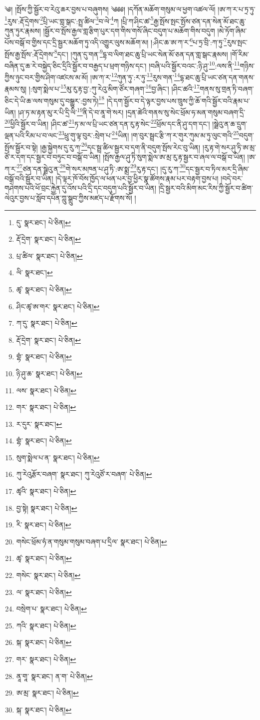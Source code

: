 \setcounter{footnote}{0} 
༄། །སྤོས་ཀྱི་སྦྱོར་བ་རེའུ་ཆར་བྱས་པ་བཞུགས། ༄༅༅། །དཀོན་མཆོག་གསུམ་ལ་ཕྱག་འཚལ་ལོ། །ཨ་ཀ་ར་པ་ཏྲ་ཏུ་\footnote{དུ་  སྣར་ཐང་།  པེ་ཅིན། }རུས་:རྡོ་དྲེགས་\footnote{རྡོ་དྲེག་  སྣར་ཐང་།  པེ་ཅིན། }པྲི་ཡང་གླ་སྒང་:སྤྲ་ཚིལ་\footnote{པྲ་ཚིལ་  སྣར་ཐང་།  པེ་ཅིན། }བ་ལེ་\footnote{ལི་  སྣར་ཐང་། }ཀ །པྲི་ཀ་ཤིང་ཚ་\footnote{ཚྭ་  སྣར་ཐང་།  པེ་ཅིན། }རྒྱ་སྤོས་སྤང་སྤོས་ཙན་དན་སེན་མོ་ཐང་ཆུ་ཀུན་ཏུར་རྣམས། །སྦྱོར་བ་སྤོས་རྒྱལ་གླ་རྩིག་པུར་དག་གིས་གསོ་ཞིང་བདུག་པ་མཆོག་གིས་བདུག །མེ་ཏོག་ཞིམ་པོས་བསྒོ་བ་གྱིས་དང་དྲི་སྦྱར་མཆོག་ཏུ་འདི་འགྱུར་ལུས་མཆོག་མ། །:ཤིང་ཆ་ཨ་ཀ་ར་\footnote{ཤིང་ཚྭ་ཨ་གར་  སྣར་ཐང་།  པེ་ཅིན། }པ་ཏྲ་བྲི་:ཀ་ཏུ་\footnote{ཀ་དུ་  སྣར་ཐང་།  པེ་ཅིན། }རུས་སྤང་སྤོས་རྒྱ་སྤོས་:རྡོ་དྲེགས་\footnote{རྡོ་དྲེག་  སྣར་ཐང་།  པེ་ཅིན། }དང་། །ཀུན་དུ་གན་\footnote{གྷཾ་  སྣར་ཐང་།  པེ་ཅིན། }དྷ་བ་ལིག་ཐང་ཆུ་པྲི་ཡང་སེན་མོ་ཅན་དན་གླ་སྒང་རྣམས། །གོ་རིམ་བཞིན་དུ་ཆ་རེ་བསྐྱེད་ཅིང་དྲིའི་སྦྱོར་བ་བརྒྱད་པ་ཕྲག་གཉིས་དང་། །བཞི་པའི་སྦྱོར་བའང་:ཉི་ཤུ་\footnote{ཉི་ཤུ་ཆ་  སྣར་ཐང་།  པེ་ཅིན། }:ལས་ནི་\footnote{ལས་  སྣར་ཐང་།  པེ་ཅིན། }གཉིས་ཀྱིས་ཉུང་བར་གྱིས་ཤིག་འཛངས་མ་མོ། །ཨ་ཀ་ར་\footnote{གར་  སྣར་ཐང་།  པེ་ཅིན། }ཀུན་ཏུ་:ར་ཏུ་\footnote{ར་དུར་  སྣར་ཐང་། }རུས་གན་\footnote{གྷཾ་  སྣར་ཐང་།  པེ་ཅིན། }དྷ་ཐང་ཆུ་པྲི་ཡང་ཙན་དན་གནས་རྣམས་སུ། །:སུག་སྨེལ་པ་\footnote{སུག་སྨེལ་པ་ན་  སྣར་ཐང་།  པེ་ཅིན། }མུ་རུ་རྟ་བྱ་:ཀུ་རེའུ་མིག་ཙོར་གཞག་\footnote{ཀུ་རེའུརྩོར་བཞག་  སྣར་ཐང་། ཀུ་རེའུཙོ་ར་བཞག་  པེ་ཅིན། }བྱ་ཞིང་། །ཤིང་ཚའི་\footnote{ཚྭའི་  སྣར་ཐང་།  པེ་ཅིན། }གནས་སུ་གྲན་ཏི་བཞག་ཅིང་དེ་ཡི་ཆ་ལས་གསུམ་དུ་བསྒྱུར་:བྱས་ཏེ།\footnote{བྱ་སྟེ།  སྣར་ཐང་།  པེ་ཅིན། } །དེ་དག་སྦྱོར་བ་དེ་ལྟར་བྱས་པས་ཁྲུས་ཀྱི་ཆོ་གའི་སྦྱོར་བའི་རྣམ་པ་ཡིན། །ཤ་ཏ་མ་རྟན་མུ་ར་པི་དྲི་ལི་\footnote{རི་  སྣར་ཐང་།  པེ་ཅིན། }ནི་དེ་བ་ནཱ་གེ་སར། །དྲན་ཚེའི་གནས་སུ་སེང་ཕྲོམ་ཧ་མན་གསུམ་བཞག་དྲི་\footnote{གསེང་ཕྲོམ་ཧཾ་ན་གསུམ་གསུམ་བཞག་པ་དྲིལ་  སྣར་ཐང་།  པེ་ཅིན། }ཕྱིའི་སྦྱོར་བ་ཡིན། །ཤིང་ཚ་\footnote{ཚྭ་  སྣར་ཐང་།  པེ་ཅིན། }ཏ་མ་ལ་པྲི་ཡང་ཙན་དན་རུ་རྟ་སེང་\footnote{གསེང་  སྣར་ཐང་།  པེ་ཅིན། }ཕྲོམ་དང་ནི་ཤུ་དག་དང་། །སྠེའུ་ན་ཆ་དྲུག་ལྡན་པའི་རིམ་པ་བ་ལང་\footnote{ལ་  སྣར་ཐང་།  པེ་ཅིན། }ཕྲུ་གུ་ལྟ་བུར་:སྲེག་པ་\footnote{བསྲེག་པ་  སྣར་ཐང་།  པེ་ཅིན། }ཡིན། །ག་བུར་སྦྲང་རྩི་ཀ་ར་གུར་ཀུམ་མ་ཏུ་ལུང་གའི་\footnote{ཀའི་  སྣར་ཐང་།  པེ་ཅིན། }བདུག་སྤོས་སྦྱོར་བ་སྟེ། །རྒྱ་སྐྱེགས་དུ་རུ་ཀ་\footnote{སྐ་  སྣར་ཐང་།  པེ་ཅིན། }དང་སྦྲ་ཚིལ་སྦྱར་བ་དག་ནི་བདུག་སྤོས་རེང་བུ་ཡིན། །རུ་རྟ་གེ་སར་ཤུ་ཏི་ཨ་མྲ་ཙོ་ར་དག་དང་སྦྱར་བ་བཏུང་བ་བསྒོ་བ་ཡིན། །སྤོས་རྒྱལ་ཤུ་ཏི་སུག་སྨེལ་ཨ་མྲ་རུ་རྟ་སྦྱར་བ་ཞལ་ལ་བསྒོ་བ་ཡིན། །ཨ་ཀ་ར་\footnote{གར་  སྣར་ཐང་།  པེ་ཅིན། }ཙན་དན་སྠེའུ་ན་\footnote{ནཱ་གཱ་  སྣར་ཐང་། ན་ག་  པེ་ཅིན། }གེ་སར་མཁན་པ་ཤུ་ཏི་:ཨ་སྨྲ་\footnote{ཨ་མྲ་  སྣར་ཐང་།  པེ་ཅིན། }རུ་རྟ་དང་། །དུ་རུ་ཀ་\footnote{སྐ་  སྣར་ཐང་།  པེ་ཅིན། }དང་སྦྱར་བ་ཏིལ་མར་དྲི་ཞིམ་བསྒོ་བའི་སྦྱོར་བ་ཡིན། །དེ་ལྟར་ཁོ་བོས་ཁྱོད་ལ་ཕན་པར་བྱ་ཕྱིར་སྣ་ཚོགས་རྣམ་པར་བརྟག་བྱས་པ། །བདེ་བར་གཤེགས་པའི་ཕོ་བྲང་རྐྱེན་དུ་འོས་པའི་དྲི་དང་བདུག་པའི་སྦྱོར་བ་ཡིན། །དྲི་སྦྱར་བའི་མིག་མང་རིས་ཀྱི་སྦྱོར་བ་ཚིག་ལེའུར་བྱས་པ་སློབ་དཔོན་ཀླུ་སྒྲུབ་ཀྱིས་མཛད་པ་རྫོགས་སོ། ། 